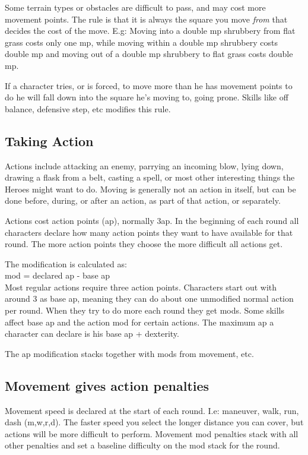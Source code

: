 Some terrain types or obstacles are difficult to pass, and may cost more movement points. The rule is that it is always the square you move \emph{from} that decides the cost of the move. E.g: Moving into a double mp shrubbery from flat grass costs only one mp, while moving within a double mp shrubbery costs double mp and moving out of a double mp shrubbery to flat grass costs double mp.

If a character tries, or is forced, to move more than he has movement points to do he will fall down into the square he's moving to, going prone. Skills like off balance, defensive step, etc modifies this rule.




\subsection*{Taking Action}
Actions include attacking an enemy, parrying an incoming blow, lying down, drawing a flask from a belt, casting a spell, or most other interesting things the Heroes might want to do. Moving is generally not an action in itself, but can be done before, during, or after an action, as part of that action, or separately.

Actions cost action points (ap), normally 3ap. In the beginning of each round all characters declare how many action points they want to have available for that round. The more action points they choose the more difficult all actions get.

The modification is calculated as: \\
mod = declared ap - base ap \\
Most regular actions require three action points. Characters start out with around 3 as base ap, meaning they can do about one unmodified normal action per round. When they try to do more each round they get mods. Some skills affect base ap and the action mod for certain actions.
The maximum ap a character can declare is his base ap + dexterity.

The ap modification stacks together with mods from movement, etc.



\subsection*{Movement gives action penalties}
Movement speed is declared at the start of each round. I.e: maneuver, walk, run, dash (m,w,r,d). The faster speed you select the longer distance you can cover, but actions will be more difficult to perform. Movement mod penalties stack with all other penalties and set a baseline difficulty on the mod stack for the round.

